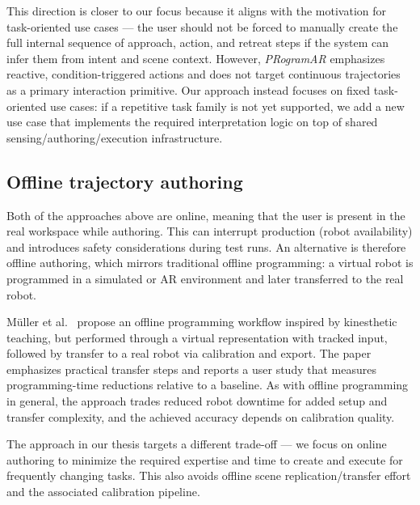 This direction is closer to our focus because it aligns with the motivation for task-oriented use cases --- the user should not be forced to manually create the full internal sequence of approach, action, and retreat steps if the system can infer them from intent and scene context. However, \emph{PRogramAR} emphasizes reactive, condition-triggered actions and does not target continuous trajectories as a primary interaction primitive. Our approach instead focuses on fixed task-oriented use cases: if a repetitive task family is not yet supported, we add a new use case that implements the required interpretation logic on top of shared sensing/authoring/execution infrastructure.

\subsection{Offline trajectory authoring}

Both of the approaches above are online, meaning that the user is present in the real workspace while authoring. This can interrupt production (robot availability) and introduces safety considerations during test runs. An alternative is therefore offline authoring, which mirrors traditional offline programming: a virtual robot is programmed in a simulated or AR environment and later transferred to the real robot.

Müller et al.~\cite{Muller2024} propose an offline programming workflow inspired by kinesthetic teaching, but performed through a virtual representation with tracked input, followed by transfer to a real robot via calibration and export. The paper emphasizes practical transfer steps and reports a user study that measures programming-time reductions relative to a baseline. As with offline programming in general, the approach trades reduced robot downtime for added setup and transfer complexity, and the achieved accuracy depends on calibration quality.

The approach in our thesis targets a different trade-off --- we focus on online authoring \DIFdelbegin {}\DIFdelend \DIFaddbegin {}\DIFaddend to minimize the required expertise and time \DIFaddbegin {}\DIFaddend to create and execute \DIFdelbegin {}\DIFdelend \DIFaddbegin {}\DIFaddend for frequently changing tasks\DIFdelbegin {}\DIFdelend . This also avoids offline scene replication/transfer effort and the associated calibration pipeline.

